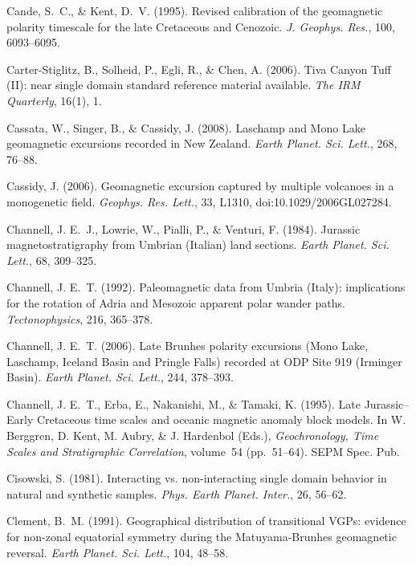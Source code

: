 \documentclass[,plain]{tauxe}
\begin{document}
\begin{thebibliography}{}
\bibitem{}%
Cande, S.~C., \& Kent, D.~V. (1995).
Revised calibration of the geomagnetic polarity timescale for the late Cretaceous and Cenozoic.
{\it J. Geophys. Res.}, 100, 6093--6095.

\bibitem{}%
Carter-Stiglitz, B., Solheid, P., Egli, R., \& Chen, A. (2006).
Tiva Canyon Tuff (II): near single domain standard reference material available.
{\it The IRM Quarterly}, 16(1), 1.

\bibitem{}%
Cassata, W., Singer, B., \& Cassidy, J. (2008).
Laschamp and Mono Lake geomagnetic excursions recorded in New Zealand.
{\it Earth Planet. Sci. Lett.}, 268, 76--88.

\bibitem{}%
Cassidy, J. (2006).
Geomagnetic excursion captured by multiple volcanoes in a monogenetic field.
{\it Geophys. Res. Lett.}, 33, L1310, doi:10.1029/2006GL027284.

\bibitem{}%
Channell, J. E.~J., Lowrie, W., Pialli, P., \& Venturi, F. (1984).
Jurassic magnetostratigraphy from Umbrian (Italian) land sections.
{\it Earth Planet. Sci. Lett.}, 68, 309--325.

\bibitem{}%
Channell, J. E.~T. (1992).
Paleomagnetic data from Umbria (Italy): implications for the rotation of Adria and Mesozoic apparent polar wander paths.
{\it Tectonophysics}, 216, 365--378.

\bibitem{}%
Channell, J. E.~T. (2006).
Late Brunhes polarity excursions (Mono Lake, Laschamp, Iceland Basin and Pringle Falls) recorded at ODP Site 919 (Irminger Basin).
{\it Earth Planet. Sci. Lett.}, 244, 378--393.

\bibitem{}%
Channell, J. E.~T., Erba, E., Nakanishi, M., \& Tamaki, K. (1995).
Late Jurassic--Early Cretaceous time scales and oceanic magnetic anomaly block models.
In W. Berggren, D. Kent, M. Aubry, \& J. Hardenbol (Eds.), {\it Geochronology, Time Scales and Stratigraphic Correlation}, volume~54 (pp.\ 51--64). SEPM Spec. Pub.

\bibitem{}%
Cisowski, S. (1981).
Interacting vs. non-interacting single domain behavior in natural and synthetic samples.
{\it Phys. Earth Planet. Inter.}, 26, 56--62.

\bibitem{}%
Clement, B.~M. (1991).
Geographical distribution of transitional {VGP}s: evidence for non-zonal equatorial symmetry during the Matuyama-Brunhes geomagnetic reversal.
{\it Earth Planet. Sci. Lett.}, 104, 48--58.


\end{thebibliography}
\end{document}
